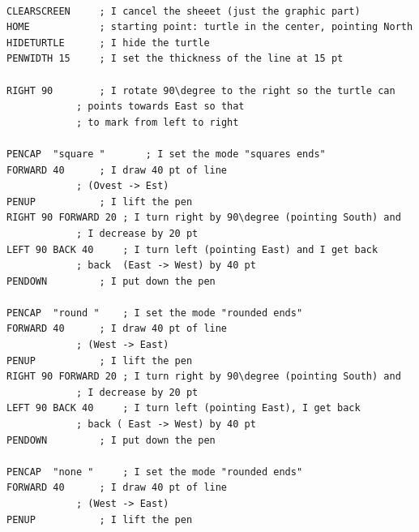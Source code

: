 \lstset{extendedchars=true, basicstyle=\scriptsize} 
\begin{lstlisting}[frame=single]  % Start your code-block

CLEARSCREEN		; I cancel the sheeet (just the graphic part)
HOME			; starting point: turtle in the center, pointing North 
HIDETURTLE		; I hide the turtle 
PENWIDTH 15		; I set the thickness of the line at 15 pt

RIGHT 90		; I rotate 90\degree to the right so the turtle can 
			; points towards East so that
			; to mark from left to right
				
PENCAP  "square "		; I set the mode "squares ends"
FORWARD 40		; I draw 40 pt of line
			; (Ovest -> Est)
PENUP  			; I lift the pen
RIGHT 90 FORWARD 20	; I turn right by 90\degree (pointing South) and 
			; I decrease by 20 pt
LEFT 90 BACK 40		; I turn left (pointing East) and I get back
			; back  (East -> West) by 40 pt
PENDOWN			; I put down the pen

PENCAP  "round "	; I set the mode "rounded ends"
FORWARD 40		; I draw 40 pt of line
			; (West -> East)
PENUP			; I lift the pen
RIGHT 90 FORWARD 20	; I turn right by 90\degree (pointing South) and
			; I decrease by 20 pt
LEFT 90 BACK 40		; I turn left (pointing East), I get back 
			; back ( East -> West) by 40 pt 
PENDOWN			; I put down the pen

PENCAP  "none "		; I set the mode "rounded ends"
FORWARD 40		; I draw 40 pt of line
			; (West -> East)
PENUP			; I lift the pen

\end{lstlisting}

\vskip 1cm

